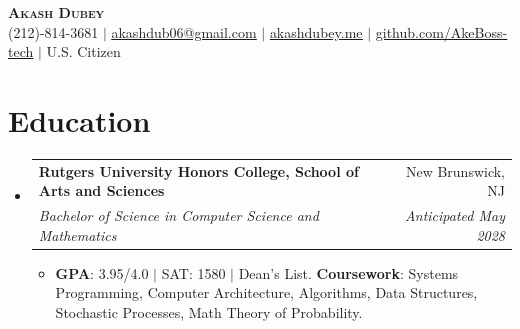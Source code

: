 \documentclass[letterpaper,11pt]{article}
\makeatletter
\newcommand{\resumeItem}[1]{
  \item\small{
    {#1 \vspace{-2pt}}
  }
}
\newcommand{\resumeSubheading}[4]{
  \vspace{-2pt}\item
    \begin{tabular*}{0.97\textwidth}[t]{l@{\extracolsep{\fill}}r}
      \textbf{#1} & #2 \\
      \textit{\small#3} & \textit{\small #4} \\
    \end{tabular*}\vspace{-7pt}
}
\newcommand{\resumeSubHeadingListStart}{\begin{itemize}[leftmargin=0.15in, label={}]}
\newcommand{\resumeSubHeadingListEnd}{\end{itemize}}
\newcommand{\resumeItemListStart}{\begin{itemize}}
\newcommand{\resumeItemListEnd}{\end{itemize}\vspace{-5pt}}
\makeatother
\begin{document}
\begin{center}
    \textbf{\Huge \scshape Akash Dubey} \\ \vspace{1pt}
    \small (212)-814-3681 $|$ \href{mailto:akashdub06@gmail.com}{\underline{akashdub06@gmail.com}} $|$
    \href{https://akashdubey.me/}{\underline{akashdubey.me}} $|$
    \href{https://github.com/AkeBoss-tech}{\underline{github.com/AkeBoss-tech}} $|$
    \small U.S. Citizen
\end{center}
\section{Education}
  \resumeSubHeadingListStart
    \resumeSubheading
      {Rutgers University Honors College, School of Arts and Sciences}{New Brunswick, NJ}
      {Bachelor of Science in Computer Science and Mathematics}{Anticipated May 2028}
      \resumeItemListStart
        \resumeItem{\textbf{GPA}: 3.95/4.0 $|$ SAT: 1580 $|$ Dean's List. \textbf{Coursework}: Systems Programming, Computer Architecture, Algorithms, Data Structures, Stochastic Processes, Math Theory of Probability.}
      \resumeItemListEnd
  \resumeSubHeadingListEnd
\end{document}
